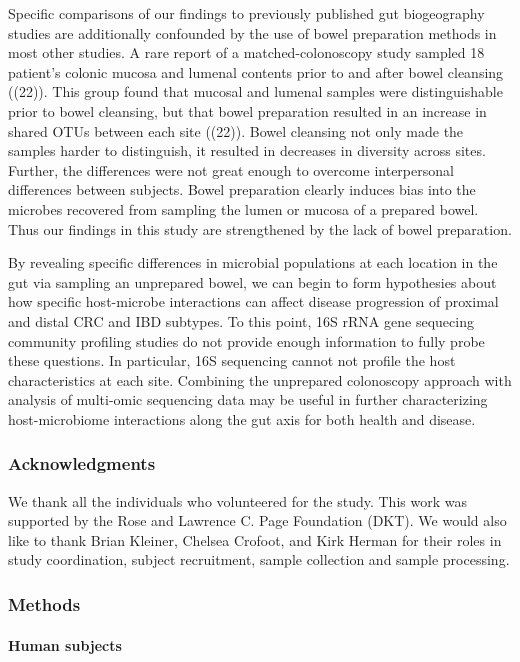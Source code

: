 \documentclass[11pt,]{article}
\let\oldparagraph\paragraph
\renewcommand{\paragraph}[1]{\oldparagraph{#1}\mbox{}}
\begin{document}
Specific comparisons of our findings to previously published gut
biogeography studies are additionally confounded by the use of bowel
preparation methods in most other studies. A rare report of a
matched-colonoscopy study sampled 18 patient's colonic mucosa and
lumenal contents prior to and after bowel cleansing ((22)). This group
found that mucosal and lumenal samples were distinguishable prior to
bowel cleansing, but that bowel preparation resulted in an increase in
shared OTUs between each site ((22)). Bowel cleansing not only made the
samples harder to distinguish, it resulted in decreases in diversity
across sites. Further, the differences were not great enough to overcome
interpersonal differences between subjects. Bowel preparation clearly
induces bias into the microbes recovered from sampling the lumen or
mucosa of a prepared bowel. Thus our findings in this study are
strengthened by the lack of bowel preparation.

By revealing specific differences in microbial populations at each
location in the gut via sampling an unprepared bowel, we can begin to
form hypothesies about how specific host-microbe interactions can affect
disease progression of proximal and distal CRC and IBD subtypes. To this
point, 16S rRNA gene sequecing community profiling studies do not
provide enough information to fully probe these questions. In
particular, 16S sequencing cannot not profile the host characteristics
at each site. Combining the unprepared colonoscopy approach with
analysis of multi-omic sequencing data may be useful in further
characterizing host-microbiome interactions along the gut axis for both
health and disease.

\subsubsection{Acknowledgments}\label{acknowledgments}

We thank all the individuals who volunteered for the study. This work
was supported by the Rose and Lawrence C. Page Foundation (DKT). We
would also like to thank Brian Kleiner, Chelsea Crofoot, and Kirk Herman
for their roles in study coordination, subject recruitment, sample
collection and sample processing.

\subsubsection{Methods}\label{methods}

\paragraph{Human subjects}\label{human-subjects}
\end{document}
